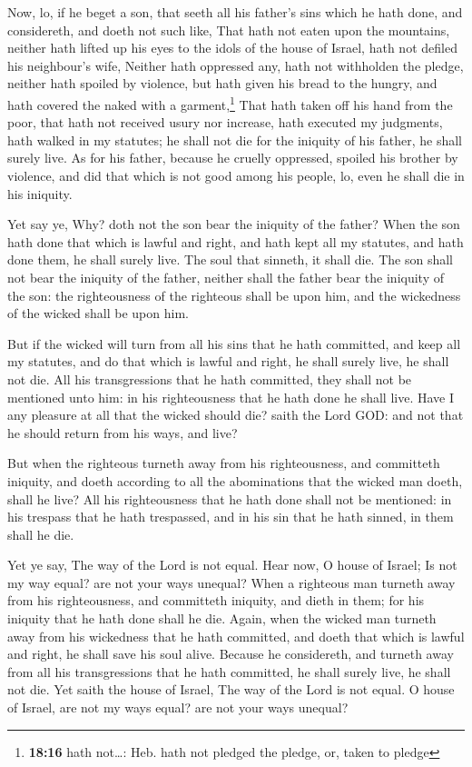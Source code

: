  Now, lo, if he beget a son, that seeth all his father's
sins which he hath done, and considereth, and doeth not such like,
 That hath not eaten upon the mountains, neither hath
lifted up his eyes to the idols of the house of Israel, hath not defiled
his neighbour's wife,  Neither hath oppressed any, hath
not withholden the pledge, neither hath spoiled by violence, but hath
given his bread to the hungry, and hath covered the naked with a
garment,\footnote{\textbf{18:16} hath not\ldots: Heb. hath not pledged
  the pledge, or, taken to pledge}  That hath taken off
his hand from the poor, that hath not received usury nor increase, hath
executed my judgments, hath walked in my statutes; he shall not die for
the iniquity of his father, he shall surely live.  As for
his father, because he cruelly oppressed, spoiled his brother by
violence, and did that which is not good among his people, lo, even he
shall die in his iniquity.

 Yet say ye, Why? doth not the son bear the iniquity of
the father? When the son hath done that which is lawful and right, and
hath kept all my statutes, and hath done them, he shall surely live.
 The soul that sinneth, it shall die. The son shall not
bear the iniquity of the father, neither shall the father bear the
iniquity of the son: the righteousness of the righteous shall be upon
him, and the wickedness of the wicked shall be upon him.

 But if the wicked will turn from all his sins that he
hath committed, and keep all my statutes, and do that which is lawful
and right, he shall surely live, he shall not die.  All
his transgressions that he hath committed, they shall not be mentioned
unto him: in his righteousness that he hath done he shall live.
 Have I any pleasure at all that the wicked should die?
saith the Lord GOD: and not that he should return from his ways, and
live?

 But when the righteous turneth away from his
righteousness, and committeth iniquity, and doeth according to all the
abominations that the wicked man doeth, shall he live? All his
righteousness that he hath done shall not be mentioned: in his trespass
that he hath trespassed, and in his sin that he hath sinned, in them
shall he die.

 Yet ye say, The way of the Lord is not equal. Hear now,
O house of Israel; Is not my way equal? are not your ways unequal?
 When a righteous man turneth away from his
righteousness, and committeth iniquity, and dieth in them; for his
iniquity that he hath done shall he die.  Again, when the
wicked man turneth away from his wickedness that he hath committed, and
doeth that which is lawful and right, he shall save his soul alive.
 Because he considereth, and turneth away from all his
transgressions that he hath committed, he shall surely live, he shall
not die.  Yet saith the house of Israel, The way of the
Lord is not equal. O house of Israel, are not my ways equal? are not
your ways unequal?

